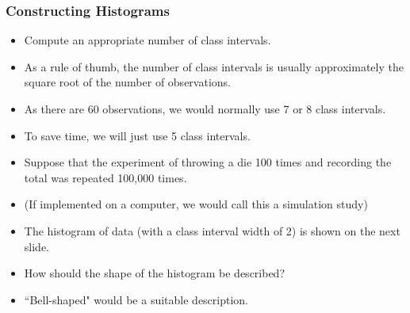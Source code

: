  \subsubsection{Constructing Histograms}
\begin{itemize}
\item Compute an appropriate number of class intervals.
\item As a rule of thumb, the number of class intervals is usually approximately the square root of the number of observations.
\item As there are 60 observations, we would normally use 7 or 8 class intervals.
\item To save time, we will just use 5 class intervals.
\end{itemize}




%



\begin{itemize}
\item Suppose that the experiment of throwing a die 100 times and recording the total was repeated 100,000 times.
\item (If implemented on a computer, we would call this a simulation study)
\item The histogram of data (with a class interval width of 2) is shown on the next slide.
\item How should the shape of the histogram be described?
\item ``Bell-shaped" would be a suitable description.
\end{itemize}




